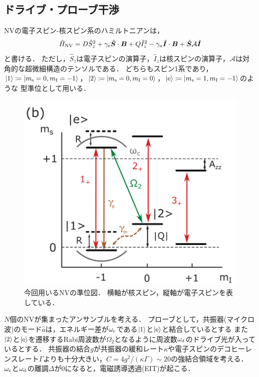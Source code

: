 \documentclass{report}
\begin{document}
      \subsection{ドライブ・プローブ干渉}
        NVの電子スピン-核スピン系のハミルトニアンは，
        \begin{align}
          \hat{H}_{\mathrm{NV}} = D\hat{S}^2_z + \gamma_{\mathrm{e}}\hat{\bm{S}}\cdot\bm{B} + Q\hat{I}^2_z - \gamma_{\mathrm{n}}\hat{\bm{I}}\cdot\bm{B} + \hat{\bm{S}}\mathcal{A}\hat{\bm{I}}
        \end{align}
        と書ける．
        ただし，$\hat{S}_z$は電子スピンの演算子，$\hat{I}_z$は核スピンの演算子，$\mathcal{A}$は対角的な超微細構造のテンソルである．
        どちらもスピン1系であり，$\ket{1} \coloneqq \ket{m_{\mathrm{s}} = 0, m_{\mathrm{I}} = -1}$，$\ket{2} \coloneqq \ket{m_{\mathrm{s}} = 0, m_{\mathrm{I}} = 0}$，$\ket{\mathrm{e}} \coloneqq \ket{m_{\mathrm{s}} = 1, m_{\mathrm{I}} = -1}$のような
        \Lambda 型準位として用いる．
        \begin{figure}[H]
          \centering
          \includegraphics[width = 0.5\linewidth]{./src/Cavity-Enhanced_Solid-State_Nuclear_Spin_Gyroscope/1_b.png}
          \caption{
            今回用いるNVの準位図．
            横軸が核スピン，縦軸が電子スピンを表している．
          }
        \end{figure}
        $N$個のNVが集まったアンサンブルを考える．
        プローブとして，共振器(マイクロ波)のモード$\hat{a}$は，エネルギー差が$\omega_{\mathrm{c}}$である$\ket{1}$と$\ket{\mathrm{e}}$と結合しているとする
        また$\ket{2}$と$\ket{\mathrm{e}}$を遷移するRabi周波数が$\Omega_2$となるように周波数$\omega_{\mathrm{d}}$のドライブ光が入っているとする．
        共振器の結合$g$が共振器の緩和レート$\kappa$や電子スピンのデコヒーレンスレート$\Gamma$よりも十分大きい，$C = 4g^2 / (\kappa\Gamma) \sim 20$の強結合領域を考える．
        $\omega_{\mathrm{c}}$と$\omega_{\mathrm{d}}$の離調$\Delta$が0になると，電磁誘導透過(EIT)が起こる．
\end{document}
